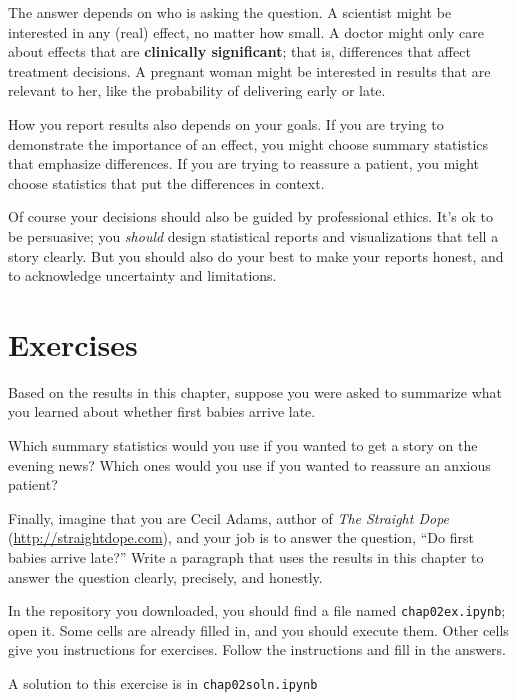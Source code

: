 \documentclass[12pt]{book}
\begin{document}
The answer depends on who is asking the question.  A scientist might
be interested in any (real) effect, no matter how small.  A doctor
might only care about effects that are {\bf clinically significant};
that is, differences that affect treatment decisions.  A pregnant
woman might be interested in results that are relevant to her, like
the probability of delivering early or late.
 

How you report results also depends on your goals.  If you are trying
to demonstrate the importance of an effect, you might choose summary
statistics that emphasize differences.  If you are trying to reassure
a patient, you might choose statistics that put the differences in
context.

Of course your decisions should also be guided by professional ethics.
It's ok to be persuasive; you {\em should\/} design statistical reports
and visualizations that tell a story clearly.  But you should also do
your best to make your reports honest, and to acknowledge uncertainty
and limitations.


\section{Exercises}

\begin{exercise}
Based on the results in this chapter, suppose you were asked to
summarize what you learned about whether first babies arrive late.

Which summary statistics would you use if you wanted to get a story
on the evening news?  Which ones would you use if you wanted to
reassure an anxious patient?

Finally, imagine that you are Cecil Adams, author of {\it The Straight
  Dope\/} (\url{http://straightdope.com}), and your job is to answer the
question, ``Do first babies arrive late?''  Write a paragraph that
uses the results in this chapter to answer the question clearly,
precisely, and honestly.

\end{exercise}

\begin{exercise}
In the repository you downloaded, you should find a file named
\verb"chap02ex.ipynb"; open it.  Some cells are already filled in, and
you should execute them.  Other cells give you instructions for
exercises.  Follow the instructions and fill in the answers.

A solution to this exercise is in \verb"chap02soln.ipynb"
\end{exercise}
\end{document}
